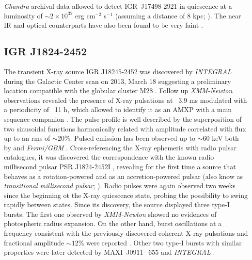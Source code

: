 \documentclass[graybox]{svmult}
\def \inte {{\em INTEGRAL\xspace}}
\def \chandra {{\em Chandra\xspace}}
\def \xmm {{\em XMM-Newton\xspace}}
\def \maxi{{\rm MAXI~J0911$-$655\xspace}}
\def \gbm{{\em Fermi/GBM\xspace}}
\begin{document}
\chandra{} archival data allowed to detect IGR~J17498-2921 in quiescence at a luminosity of $\sim2\times10^{32}$ erg cm$^{-2}$ s$^{-1}$ (assuming a distance of 8 kpc; \cite{Jonker2011}). The near IR and optical counterparts have also been found to be very faint \cite{Greiss2011,Russell2011,Torres2011}. 


\subsection{IGR J1824-2452}


The transient X-ray source IGR J18245-2452 was discovered by \inte{} during the Galactic Center scan on 2013, March 18 suggesting a preliminary location compatible with the globular cluster M28 \cite{Eckert2013}. Follow up \xmm{} observations revealed the presence of X-ray pulsations at ~3.9 ms modulated with a periodicity of ~11 h, which allowed to identify it as an AMXP with a main sequence companion \cite{Papitto2013b}. The pulse profile is well described by the superposition of two sinusoidal functions harmonically related with amplitude correlated with flux up to an rms of $\sim20$\%. Pulsed emission has been observed up to $\sim60$ keV both by \isgri{} and \gbm{} \cite{Defalco2017b}.
Cross-referencing the X-ray ephemeris with radio pulsar catalogues, it was discovered the correspondence with the known radio millisecond pulsar PSR J1824-2452I \cite{Begin2006}, revealing for the first time a source that behaves as a rotation-powered and as an accretion-powered pulsar (also know as {\it transitional millisecond pulsar}; \cite{Papitto2013b}). Radio pulses were again observed two weeks since the beginning ot the X-ray quiescence state, probing the possibility to swing rapidly between states. 
Since its discovery, the source displayed three type-I bursts. The first one observed by \xmm{} showed no evidences of photospheric radius expansion. On the other hand, burst oscillations at a frequency consistent with the previously discovered coherent X-ray pulsations and fractional amplitude $\sim12$\% were reported \cite{Papitto2013b}. Other two type-I bursts with similar properties were later detected by \maxi{} and \inte{} \cite{Serino2013,defalco2017}.
\end{document}
